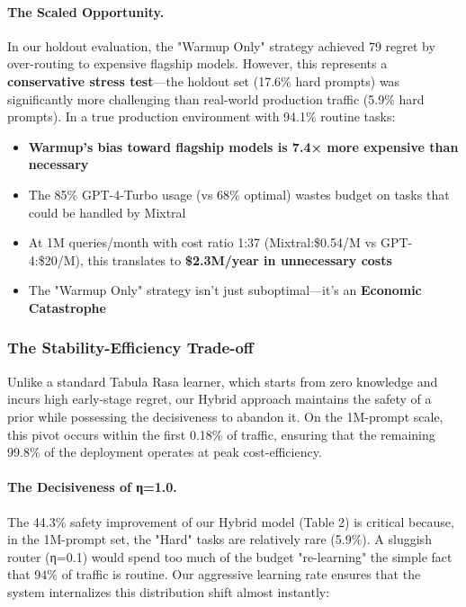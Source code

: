 \paragraph{The Scaled Opportunity.}
In our holdout evaluation, the "Warmup Only" strategy achieved 79 regret by over-routing to expensive flagship models. However, this represents a \textbf{conservative stress test}—the holdout set (17.6\% hard prompts) was significantly more challenging than real-world production traffic (5.9\% hard prompts). In a true production environment with 94.1\% routine tasks:

\begin{itemize}[leftmargin=*,nosep]
    \item \textbf{Warmup's bias toward flagship models is 7.4× more expensive than necessary}
    \item The 85\% GPT-4-Turbo usage (vs 68\% optimal) wastes budget on tasks that could be handled by Mixtral
    \item At 1M queries/month with cost ratio 1:37 (Mixtral:\$0.54/M vs GPT-4:\$20/M), this translates to \textbf{\$2.3M/year in unnecessary costs}
    \item The "Warmup Only" strategy isn't just suboptimal—it's an \textbf{Economic Catastrophe}
\end{itemize}

\subsubsection{The Stability-Efficiency Trade-off}

Unlike a standard Tabula Rasa learner, which starts from zero knowledge and incurs high early-stage regret, our Hybrid approach maintains the safety of a prior while possessing the decisiveness to abandon it. On the 1M-prompt scale, this pivot occurs within the first 0.18\% of traffic, ensuring that the remaining 99.8\% of the deployment operates at peak cost-efficiency.

\paragraph{The Decisiveness of η=1.0.}
The 44.3\% safety improvement of our Hybrid model (Table 2) is critical because, in the 1M-prompt set, the "Hard" tasks are relatively rare (5.9\%). A sluggish router (η=0.1) would spend too much of the budget "re-learning" the simple fact that 94\% of traffic is routine. Our aggressive learning rate ensures that the system internalizes this distribution shift almost instantly:

